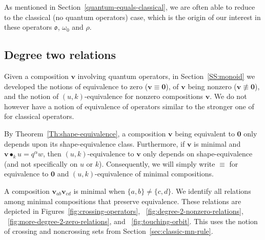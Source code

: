 \documentclass[12pt,oneside,reqno]{amsart}
\theoremstyle{definition}
\numberwithin{equation}{section}
\newcommand{\qv}{{\mathbf v}}
\newcommand{\bzero}{{\mathbf 0}}
\DeclareMathOperator{\kactionop}{{\scriptstyle \bullet}}
\newcommand{\kaction}[1][k]{\kactionop_{#1}}
\newcommand{\ncycle}{\mathfrak o}
\begin{document}
As mentioned in Section~\ref{quantum-equals-classical}, we are often able to reduce to the classical (no quantum operators) case,
which is the origin of our interest in these operators $\ncycle$, $\omega_0$ and $\rho$.  


\subsection{Degree two relations}
\label{S:degreeTwo}

Given a composition $\qv$ involving quantum operators, in
Section~\ref{SS:monoid} we developed the notions of equivalence to zero
($\qv\equiv\bzero$),
of $\qv$ being nonzero ($\qv\not\equiv\bzero$),
and the notion of $(u,k)$-equivalence for nonzero compositions $\qv$.
We do not however have a notion of equivalence of operators similar to the stronger one of~\cite{BS-Monoid} for classical
operators.

By Theorem~\ref{Th:shape-equivalence}, a composition $\qv$ being equivalent to $\bzero$ only depends upon its shape-equivalence class.
Furthermore, if $\qv$ is minimal and $\qv\kaction u=q^\alpha w$, then $(u,k)$-equivalence to $\qv$ only depends on
shape-equivalence (and not specifically on $u$ or $k$).
Consequently, we will simply write $\equiv$ for equivalence to $\bzero$ and $(u,k)$-equivalence of minimal compositions.

A composition $\qv_{ab}\qv_{cd}$ is minimal when $\{a,b\}\neq\{c,d\}$.
We identify all relations among minimal compositions that preserve equivalence.
These relations are  depicted in
Figures~\ref{fig:crossing-operators},
~\ref{fig:degree-2-nonzero-relations},
~\ref{fig:more-degree-2-zero-relations},
and
~\ref{fig:touching-orbit}.
This uses the notion of crossing and noncrossing sets from Section~\ref{sec:classic-mn-rule}.
\end{document}
